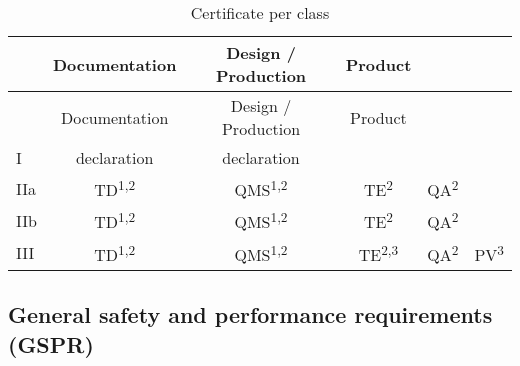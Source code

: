 \documentclass[
]{scrartcl}
\begin{document}
\begin{longtable}[]{@{}lcccll@{}}
\caption{Certificate per class}\tabularnewline
\toprule
& Documentation & Design / Production & Product & & \\
\midrule
\endfirsthead
\toprule
& Documentation & Design / Production & Product & & \\
\midrule
\endhead
I & declaration & declaration & & & \\
IIa & TD\textsuperscript{1,2} & QMS\textsuperscript{1,2} & TE\textsuperscript{2} & QA\textsuperscript{2} & \\
IIb & TD\textsuperscript{1,2} & QMS\textsuperscript{1,2} & TE\textsuperscript{2} & QA\textsuperscript{2} & \\
III & TD\textsuperscript{1,2} & QMS\textsuperscript{1,2} & TE\textsuperscript{2,3} & QA\textsuperscript{2} & PV\textsuperscript{3} \\
\bottomrule
\end{longtable}

\hypertarget{subsec:GSPR}{%
\subsection{General safety and performance requirements (GSPR)}\label{subsec:GSPR}}
\end{document}
